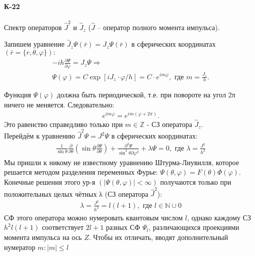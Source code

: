 \documentclass[__main__.tex]{subfiles}
\begin{document}
\paragraph{К-22}
Спектр операторов $\hat{J}^2$ и $\hat{J}_z$ ($\hat{J}$ -- оператор полного момента импульса).

Запишем уравнение $\hat{J}_z\Psi(\bar r)=J_z\Psi(\bar{r})$ в сферических координатах $\left(\bar{r}=\{r,\theta,\varphi\}\right):$
\begin{gather*}
	-ih\frac{\partial\Psi}{\partial\varphi}=J_z\Psi\Rightarrow\\
	\Psi(\varphi)=C\exp\left[iJ_z\cdot \varphi/h\right]=C\cdot e^{im\varphi},\text{ где } m=\frac{J_z}{h}.
\end{gather*}	

Функция $\Psi(\varphi)$ должна быть периодической, т.е. при повороте на угол 2π ничего не меняется. Следовательно:
\begin{gather*}
	e^{im\varphi}=e^{im(\varphi+2π)}.
\end{gather*}
Это равенство справедливо только при $m\in\mathbb Z$ - СЗ оператора $\hat{J}_z.$\\

Перейдём к уравнению $\hat{J}^2\Psi=J^2\Psi$ в сферических координатах:
\begin{gather*}
	\frac{1}{\sin\theta}\frac{\partial}{\partial\theta}\left(\sin\theta\frac{\partial\Psi}{\partial\theta}\right)+\frac{\partial^2\Psi}{\sin^2\theta\partial\varphi^2}+\lambda\Psi=0,\text{ где }\lambda=\frac{J^2}{h^2}
\end{gather*}
Мы пришли к никому не известному уравнению Штурма-Лиувилля, которое решается методом разделения переменных Фурье: $\Psi\left(\theta,\varphi\right)=F(\theta)\Phi(\varphi).$ Конечные решения этого ур-я $\left(\vert\Psi(\theta,\varphi)\vert<\infty\right)$ получаются только при положительных целых чётных λ (СЗ оператора $\hat{J}^2$):
\begin{gather*}
	\lambda=\frac{J^2}{h^2}=l(l+1),\text{ где }l\in\mathbb{N}\cup0
\end{gather*}
СФ этого оператора можно нумеровать квантовым числом $l$, однако каждому СЗ $h^2l(l+1)$ соответствует $2l+1$ разных СФ $\Psi_l$, различающихся проекциями момента импульса на ось $Z.$ Чтобы их отличать, вводят дополнительный нумератор $m : \vert m\vert\le l$
\end{document}
